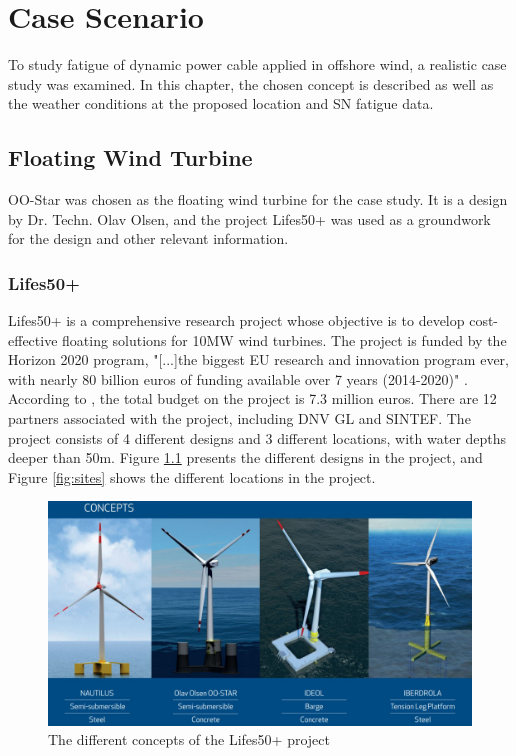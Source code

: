 \chapter{Case Scenario}
To study fatigue of dynamic power cable applied in offshore wind, a realistic case study was examined. In this chapter, the chosen concept is described as well as the weather conditions at the proposed location and SN fatigue data. 
\section{Floating Wind Turbine}
OO-Star was chosen as the floating wind turbine for the case study. It is a design by Dr. Techn. Olav Olsen, and the project Lifes50+ was used as a groundwork for the design and other relevant information. 
\subsection{Lifes50+}
Lifes50+ is a comprehensive research project whose objective is to develop cost-effective floating solutions for 10MW wind turbines. The project is funded by the Horizon 2020 program, "[...]the biggest EU research and innovation program ever, with nearly 80 billion euros of funding available over 7 years (2014-2020)" \cite{Horizon2010}. According to \cite{Olavolsen}, the total budget on the project is 7.3 million euros. There are 12 partners associated with the project, including DNV GL and SINTEF. The project consists of 4 different designs and 3 different locations, with water depths deeper than 50m. Figure \ref{fig:concept} presents the different designs in the project, and Figure \ref{fig:sites} shows the different locations in the project. 

\begin{figure}[H]
\centering
\includegraphics[scale=0.4]{figures/concepts}
\caption[$\; \:$Concepts of the Lifes50+ project]{The different concepts of the Lifes50+ project \cite{Lifes50+} }
 \label{fig:concept}
\end{figure}


